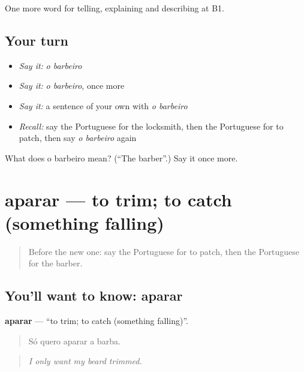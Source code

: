 \begin{grammarlens}[title={What you've built}]
One more word for telling, explaining and describing at B1.
\end{grammarlens}

\subsection*{Your turn}
\begin{itemize}
\raggedright
  \item \emph{Say it:} \emph{o barbeiro}
  \item \emph{Say it:} \emph{o barbeiro}, once more
  \item \emph{Say it:} a sentence of your own with \emph{o barbeiro}
  \item \emph{Recall:} say the Portuguese for the locksmith, then the Portuguese for to patch, then say \emph{o barbeiro} again
\end{itemize}

\begin{tcolorbox}[breakable,colback=teal!4,colframe=teal!35!black,title={Before you move on}]
What does o barbeiro mean? (\textquotedblleft{}The barber\textquotedblright{}.) Say it once more.
\end{tcolorbox}
\section[aparar]{aparar — to trim; to catch (something falling)}

\label{lesson:PT-C452-aparar}



\begin{quote}
Before the new one: say the Portuguese for to patch, then the Portuguese for the barber.
\end{quote}

\subsection*{You'll want to know: aparar}
\textbf{aparar} — \textquotedblleft{}to trim; to catch (something falling)\textquotedblright{}.

\begin{quote}
Só quero aparar a barba.
\end{quote}

\begin{quote}
\emph{I only want my beard trimmed.}
\end{quote}

